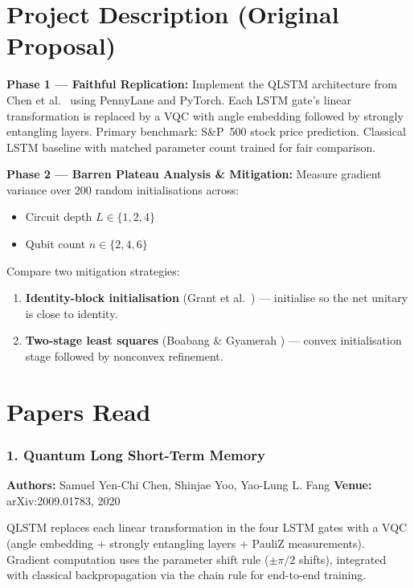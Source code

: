 \documentclass[11pt,a4paper]{article}
\begin{document}
\section{Project Description (Original Proposal)}

\textbf{Phase 1 — Faithful Replication:} Implement the QLSTM architecture from Chen et al.\ \cite{chen2020} using PennyLane and PyTorch. Each LSTM gate's linear transformation is replaced by a VQC with angle embedding followed by strongly entangling layers. Primary benchmark: S\&P~500 stock price prediction. Classical LSTM baseline with matched parameter count trained for fair comparison.

\textbf{Phase 2 — Barren Plateau Analysis \& Mitigation:} Measure gradient variance over 200 random initialisations across:
\begin{itemize}
  \item Circuit depth $L \in \{1, 2, 4\}$
  \item Qubit count $n \in \{2, 4, 6\}$
\end{itemize}
Compare two mitigation strategies:
\begin{enumerate}
  \item \textbf{Identity-block initialisation} (Grant et al.\ \cite{grant2019}) — initialise so the net unitary is close to identity.
  \item \textbf{Two-stage least squares} (Boabang \& Gyamerah \cite{boabang2026}) — convex initialisation stage followed by nonconvex refinement.
\end{enumerate}

\section{Papers Read}

\subsubsection*{1. Quantum Long Short-Term Memory}
\textbf{Authors:} Samuel Yen-Chi Chen, Shinjae Yoo, Yao-Lung L. Fang \quad
\textbf{Venue:} arXiv:2009.01783, 2020

QLSTM replaces each linear transformation in the four LSTM gates with a VQC (angle embedding + strongly entangling layers + PauliZ measurements). Gradient computation uses the parameter shift rule ($\pm\pi/2$ shifts), integrated with classical backpropagation via the chain rule for end-to-end training.
\end{document}
